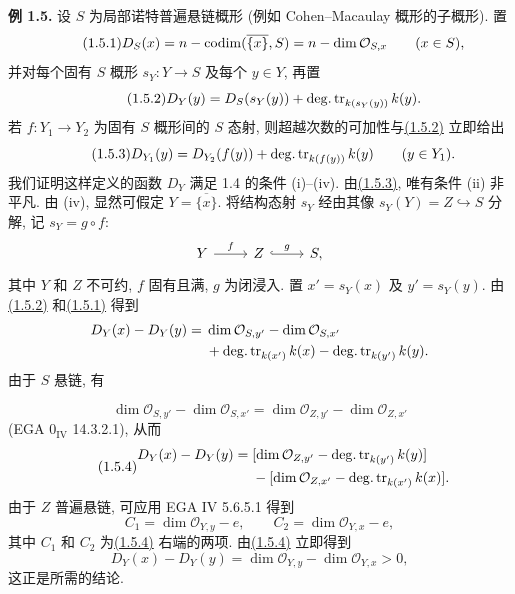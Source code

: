 \textbf{例 1.5.} 设 $S$ 为局部诺特普遍悬链概形 (例如 Cohen--Macaulay 概形的子概形). 置
%
%
\begin{equation}\tag{1.5.1}
D_S(x)=n-\operatorname{codim}(\overline{\{x\}},S)
      =n-\dim\mathcal O_{S,x}\qquad(x\in S),
\end{equation}
并对每个固有 $S$ 概形 $s_Y:Y\to S$ 及每个 $y\in Y$, 再置
\begin{equation}\tag{1.5.2}
D_Y(y)=D_S(s_Y(y))+\operatorname{deg.tr}_{k(s_Y(y))}k(y).
\end{equation}
若 $f:Y_1\to Y_2$ 为固有 $S$ 概形间的 $S$ 态射, 则超越次数的可加性与\hyperlink{sga6.e10.eq.1-5-2}{(1.5.2)} 立即给出
%
\begin{equation}\tag{1.5.3}
D_{Y_1}(y)=D_{Y_2}(f(y))+\operatorname{deg.tr}_{k(f(y))}k(y)
\qquad(y\in Y_1).
\end{equation}
我们证明这样定义的函数 $D_Y$ 满足 1.4 的条件 (i)--(iv). 由\hyperlink{sga6.e10.eq.1-5-3}{(1.5.3)}, 唯有条件 (ii) 非平凡. 由 (iv), 显然可假定 $Y=\overline{\{x\}}$. 将结构态射 $s_Y$ 经由其像 $s_Y(Y)=Z\hookrightarrow S$ 分解, 记 $s_Y=g\circ f$:
%
%
%
%
\[
\begin{tikzcd}
Y \arrow[r,"f"] & Z \arrow[r,hook,"g"] & S,
\end{tikzcd}
\]
其中 $Y$ 和 $Z$ 不可约, $f$ 固有且满, $g$ 为闭浸入. 置 $x'=s_Y(x)$ 及 $y'=s_Y(y)$. 由\hyperlink{sga6.e10.eq.1-5-2}{(1.5.2)} 和\hyperlink{sga6.e10.eq.1-5-1}{(1.5.1)} 得到
%
%
\[
\begin{split}
D_Y(x)-D_Y(y)={}&\dim\mathcal O_{S,y'}-\dim\mathcal O_{S,x'}\\
&+\operatorname{deg.tr}_{k(x')}k(x)-\operatorname{deg.tr}_{k(y')}k(y).
\end{split}
\]
由于 $S$ 悬链, 有

\[
\dim\mathcal O_{S,y'}-\dim\mathcal O_{S,x'}
=\dim\mathcal O_{Z,y'}-\dim\mathcal O_{Z,x'}
\]
(EGA $0_{\mathrm{IV}}$ 14.3.2.1), 从而
\begin{equation}\tag{1.5.4}
\begin{split}
D_Y(x)-D_Y(y)={}&
[\dim\mathcal O_{Z,y'}-\operatorname{deg.tr}_{k(y')}k(y)]\\
&-[\dim\mathcal O_{Z,x'}-\operatorname{deg.tr}_{k(x')}k(x)].
\end{split}
\end{equation}
由于 $Z$ 普遍悬链, 可应用 EGA IV 5.6.5.1 得到
\[
C_1=\dim\mathcal O_{Y,y}-e,
\qquad
C_2=\dim\mathcal O_{Y,x}-e,
\]
其中 $C_1$ 和 $C_2$ 为\hyperlink{sga6.e10.eq.1-5-4}{(1.5.4)} 右端的两项. 由\hyperlink{sga6.e10.eq.1-5-4}{(1.5.4)} 立即得到
%
\[
D_Y(x)-D_Y(y)
=\dim\mathcal O_{Y,y}-\dim\mathcal O_{Y,x}>0,
\]
这正是所需的结论.

